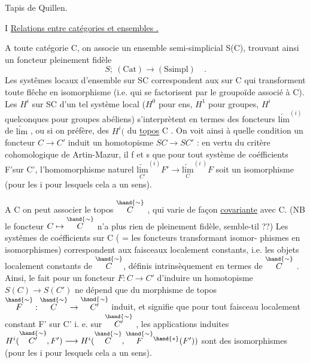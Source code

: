 
Tapis de Quillen.

I \quad \uline{Relations entre catégories et ensembles .}

A toute catégorie C,  on associe un ensemble semi-simplicial S(C),
trouvant ainsi un foncteur pleinement fidèle 
\[ S; \ (\mathrm{Cat}) \longrightarrow (\mathrm{Ssimpl}) \quad . \]
 Les systêmes locaux d'ensemble sur SC correspondent
aux  sur C qui transforment toute flêche en isomorphisme (i.e.
qui se factorisent par le groupoïde associé à  C). Les $H^i$ sur SC d'un tel
système local ($H^0$ pour ens, $H^1$ pour groupes, $H^i$ quelconques pour groupes
abéliens) s'interprètent en termes des foncteurs $\underleftarrow{\mathrm{lim}}^{(i)}$  de $\underleftarrow{\mathrm{lim}}$ ,
ou si on préfère, des $H^i($ du \uline{topos} C . On voit ainsi à quelle condition
un foncteur  $C \to C'$ induit un  homotopisme  $SC \to SC'$ :  en vertu du
critère cohomologique de Artin-Mazur, il f et s que  pour tout système
de coéfficients  F'sur C', l'homomorphisme naturel $\underset{C'}{\underleftarrow{\mathrm{lim}}}^{(i)}F' \longrightarrow \underset{C}{\underleftarrow{\mathrm{lim}}}^{(i\ )}F$
soit un isomorphisme (pour les i pour lesquels cela a un sens). 

A C on peut associer le topos $\overset{\hand{\sim}}{C}$ , qui varie de façon \uline{covariante} avec C.
(NB le foncteur $C \mapsto \overset{\hand{\sim}}{C}$  n'a plus rien de pleinement fidèle, semble-til ??)
Les systêmes de coéfficients  sur C ( =  les foncteurs  transformant isomor-%
phismes en isomorphismes) correspondent aux faisceaux localement constants,
i.e. les objets localement constants de $\overset{\hand{\sim}}{C}$, définis intrinsèquement en termes
de $\overset{\hand{\sim}}{C}$ .  Ainsi, le fait pour un foncteur $F:C \to C'$ d'induire un
homotopisme $S(C) \to S(C')$  ne  dépend que du morphisme de topos $\overset{\hand{\sim}}{F}: \overset{\hand{\sim}}{C} \to \overset{\hand{\sim}}{C'}$
induit, et signifie que pour tout faisceau localement constant F' sur C' i.
e. sur $\overset{\hand{\sim}}{C'}$ ,  les applications induites  $H^i(\overset{\hand{\sim}}{C'},F') \longrightarrow H^i(\overset{\hand{\sim}}{C},\overset{\hand{\sim}}{F}{}^{\hand{*}}(F'))$
sont des isomorphismes (pour les i pour lesquels cela a un sens).

